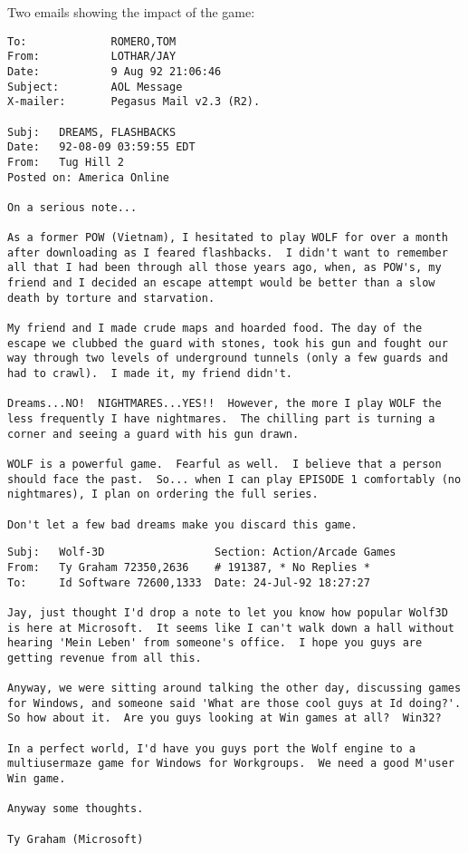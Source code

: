 \documentclass[book.tex]{subfiles}
\begin{document}
Two emails showing the impact of the game:\\
\begin{lstlisting}[breaklines=true,breakindent=0em]
To:             ROMERO,TOM
From:           LOTHAR/JAY
Date:           9 Aug 92 21:06:46
Subject:        AOL Message
X-mailer:       Pegasus Mail v2.3 (R2).

Subj:   DREAMS, FLASHBACKS
Date:   92-08-09 03:59:55 EDT
From:   Tug Hill 2
Posted on: America Online

On a serious note...

As a former POW (Vietnam), I hesitated to play WOLF for over a month after downloading as I feared flashbacks.  I didn't want to remember all that I had been through all those years ago, when, as POW's, my friend and I decided an escape attempt would be better than a slow death by torture and starvation.

My friend and I made crude maps and hoarded food. The day of the escape we clubbed the guard with stones, took his gun and fought our way through two levels of underground tunnels (only a few guards and had to crawl).  I made it, my friend didn't.

Dreams...NO!  NIGHTMARES...YES!!  However, the more I play WOLF the less frequently I have nightmares.  The chilling part is turning a corner and seeing a guard with his gun drawn.

WOLF is a powerful game.  Fearful as well.  I believe that a person should face the past.  So... when I can play EPISODE 1 comfortably (no nightmares), I plan on ordering the full series.

Don't let a few bad dreams make you discard this game.
\end{lstlisting}
\par
\begin{lstlisting}[breaklines=true,breakindent=0em]
Subj:   Wolf-3D                 Section: Action/Arcade Games
From:   Ty Graham 72350,2636    # 191387, * No Replies *
To:     Id Software 72600,1333  Date: 24-Jul-92 18:27:27

Jay, just thought I'd drop a note to let you know how popular Wolf3D is here at Microsoft.  It seems like I can't walk down a hall without hearing 'Mein Leben' from someone's office.  I hope you guys are getting revenue from all this.

Anyway, we were sitting around talking the other day, discussing games for Windows, and someone said 'What are those cool guys at Id doing?'.  So how about it.  Are you guys looking at Win games at all?  Win32?

In a perfect world, I'd have you guys port the Wolf engine to a multiusermaze game for Windows for Workgroups.  We need a good M'user Win game.

Anyway some thoughts.

Ty Graham (Microsoft)
\end{lstlisting}

 
\end{document}
